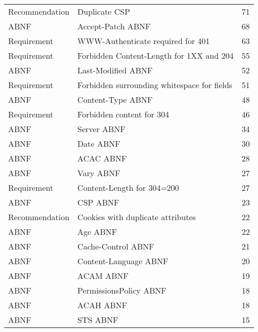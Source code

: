 \begin{tabular}{llr}
     Recommendation &                               Duplicate CSP &       71 \\
               ABNF &                           Accept-Patch ABNF &       68 \\
        Requirement &           WWW-Authenticate required for 401 &       63 \\
        Requirement &    Forbidden Content-Length for 1XX and 204 &       55 \\
               ABNF &                          Last-Modified ABNF &       52 \\
        Requirement & Forbidden surrounding whitespace for fields &       51 \\
               ABNF &                           Content-Type ABNF &       48 \\
        Requirement &                   Forbidden content for 304 &       46 \\
               ABNF &                                 Server ABNF &       34 \\
               ABNF &                                   Date ABNF &       30 \\
               ABNF &                                   ACAC ABNF &       28 \\
               ABNF &                                   Vary ABNF &       27 \\
        Requirement &                  Content-Length for 304=200 &       27 \\
               ABNF &                                    CSP ABNF &       23 \\
     Recommendation &           Cookies with duplicate attributes &       22 \\
               ABNF &                                    Age ABNF &       22 \\
               ABNF &                          Cache-Control ABNF &       21 \\
               ABNF &                       Content-Language ABNF &       20 \\
               ABNF &                                   ACAM ABNF &       19 \\
               ABNF &                      PermissionsPolicy ABNF &       18 \\
               ABNF &                                   ACAH ABNF &       18 \\
               ABNF &                                    STS ABNF &       15 \\

\end{tabular}
